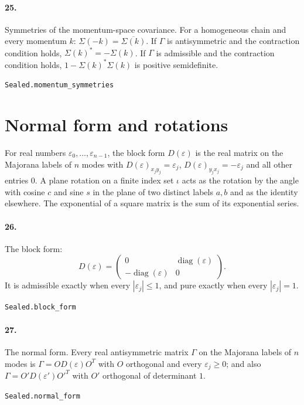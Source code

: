 \documentclass[11pt]{article}
\begin{document}
\paragraph{25.} Symmetries of the momentum-space covariance. For a homogeneous chain and every momentum $k$: $\Sigma(-k) = \overline{\Sigma(k)}$. If $\Gamma$ is antisymmetric and the contraction condition holds, $\Sigma(k)^* = -\Sigma(k)$. If $\Gamma$ is admissible and the contraction condition holds, $1 - \Sigma(k)^* \Sigma(k)$ is positive semidefinite.\par{\footnotesize\texttt{Sealed.momentum\_symmetries}}

\section*{Normal form and rotations}
For real numbers $\varepsilon_0, \dots, \varepsilon_{n-1}$, the block form $D(\varepsilon)$ is the real matrix on the Majorana labels of $n$ modes with $D(\varepsilon)_{x_j y_j} = \varepsilon_j$, $D(\varepsilon)_{y_j x_j} = -\varepsilon_j$ and all other entries $0$. A plane rotation on a finite index set $\iota$ acts as the rotation by the angle with cosine $c$ and sine $s$ in the plane of two distinct labels $a, b$ and as the identity elsewhere. The exponential of a square matrix is the sum of its exponential series.

\paragraph{26.} The block form: \[D(\varepsilon) = \begin{pmatrix} 0 & \operatorname{diag}(\varepsilon) \\ -\operatorname{diag}(\varepsilon) & 0 \end{pmatrix}.\] It is admissible exactly when every $|\varepsilon_j| \le 1$, and pure exactly when every $|\varepsilon_j| = 1$.\par{\footnotesize\texttt{Sealed.block\_form}}

\paragraph{27.} The normal form. Every real antisymmetric matrix $\Gamma$ on the Majorana labels of $n$ modes is $\Gamma = O D(\varepsilon) O^T$ with $O$ orthogonal and every $\varepsilon_j \ge 0$; and also $\Gamma = O' D(\varepsilon') O'^T$ with $O'$ orthogonal of determinant $1$.\par{\footnotesize\texttt{Sealed.normal\_form}}
\end{document}
